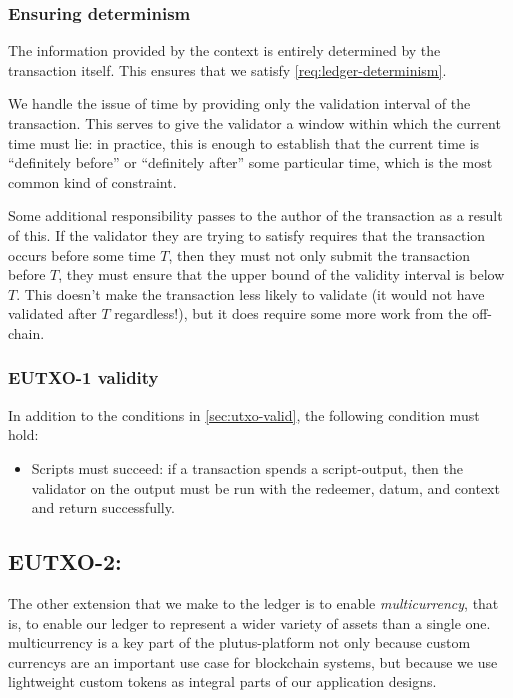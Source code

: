 \subsubsection{Ensuring determinism}
The information provided by the \gls{context} is entirely determined by the transaction itself.
This ensures that we satisfy \cref{req:ledger-determinism}.

We handle the issue of time by providing only the validation interval of the transaction.
This serves to give the \gls{validator} a window within which the current time must lie: in practice, this is enough to establish that the current time is ``definitely before'' or ``definitely after'' some particular time, which is the most common kind of constraint.

Some additional responsibility passes to the author of the transaction as a result of this.
If the \gls{validator} they are trying to satisfy requires that the transaction occurs before some time $T$, then they must not only submit the transaction before $T$, they must ensure that the upper bound of the validity interval is below $T$.
This doesn't make the transaction less likely to validate (it would not have validated after $T$ regardless!), but it does require some more work from the \gls{off-chain}.

\subsubsection{EUTXO-1 validity}
\label{sec:eutxo-1-valid}

In addition to the conditions in \cref{sec:utxo-valid}, the following condition must hold:
\begin{itemize}
\item Scripts must succeed: if a transaction spends a \gls{script-output}, then the \gls{validator} on the output must be run with the \gls{redeemer}, \gls{datum}, and \gls{context} and return successfully.
\end{itemize}

\subsection{EUTXO-2: }
\label{sec:multicurrency}


The other extension that we make to the ledger is to enable \emph{\gls{multicurrency}}, that is, to enable our ledger to represent a wider variety of assets than a single one.
\Gls{multicurrency} is a key part of the \gls{plutus-platform} not only because custom \glspl{currency} are an important use case for blockchain systems, but because we use lightweight custom \glspl{token} as integral parts of our application designs.

